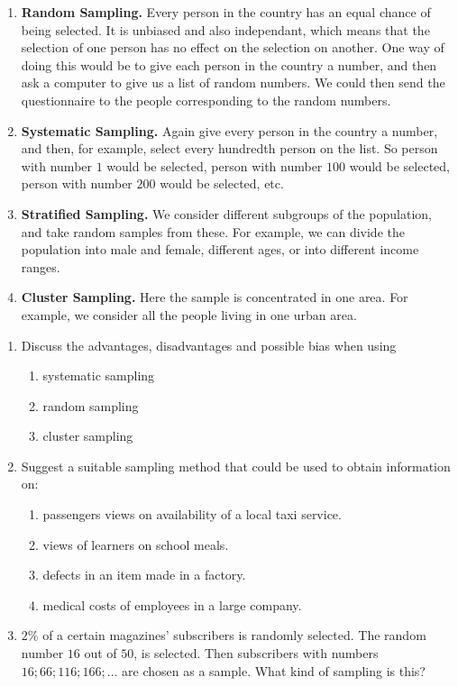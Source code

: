 \begin{enumerate}
\item[] \textbf{Random Sampling.} Every person in the country has an equal chance of being selected. It is unbiased and also independant, which means that the selection of one person has no effect on the selection on another. One way of doing this would be to give each person in the country a number, and then ask a computer to give us a list of random numbers. We could then send the questionnaire to the people corresponding to the random numbers.
\item[]  \textbf{Systematic Sampling.} Again give every person in the country a number, and then, for example, select every hundredth person on the list. So person with number $1$ would be selected, person with number $100$ would be selected, person with number $200$ would be selected, etc.
\item[] \textbf{Stratified Sampling.} We consider different subgroups of the population, and take random samples from these. For example, we can divide the population into male and female, different ages, or into different income ranges. 
\item[] \textbf{Cluster Sampling.} Here the sample is concentrated in one area. For example, we consider all the people living in one urban area.
\end{enumerate}

{
\begin{enumerate}
\item Discuss the advantages, disadvantages and possible bias when using
\begin{enumerate}
\item systematic sampling
\item random sampling
\item cluster sampling
\end{enumerate}
\item Suggest a suitable sampling method that could be used to obtain information on:
\begin{enumerate}
\item passengers views on availability of a local taxi service.
\item views of learners on school meals.
\item defects in an item made in a factory.
\item medical costs of employees in a large company.
\end{enumerate}
\item $2\%$ of a certain magazines' subscribers is randomly selected. The random number $16$ out of $50$, is selected. Then subscribers with numbers $16; 66; 116; 166; \ldots$ are chosen as a sample. What kind of sampling is this?
\end{enumerate}

\practiceinfo}


